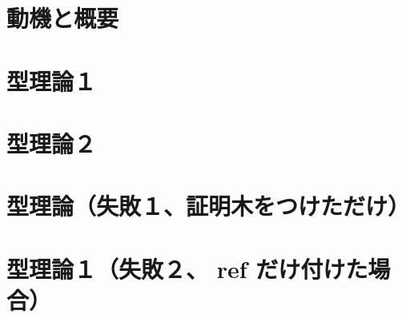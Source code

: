 \documentclass[dvipdfmx]{jsarticle}
\begin{document}
\section{動機と概要}


\newpage

\section{型理論１}

\newpage

\newpage


\section{型理論２}


\newpage
\section{型理論（失敗１、証明木をつけただけ）}

\newpage
\section{型理論１（失敗２、 ref だけ付けた場合）}

\end{document}
